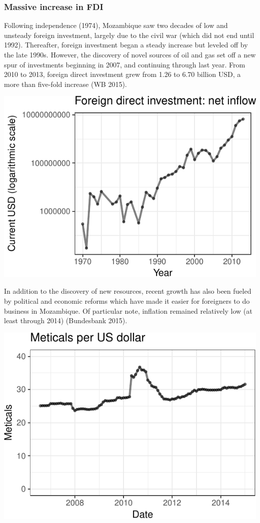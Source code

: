 \documentclass[]{elsarticle} %
\begin{document}
\subsubsection{Massive increase in FDI}\label{massive-increase-in-fdi}

Following independence (1974), Mozambique saw two decades of low and
unsteady foreign investment, largely due to the civil war (which did not
end until 1992). Thereafter, foreign investment began a steady increase
but leveled off by the late 1990s. However, the discovery of novel
sources of oil and gas set off a new spur of investments beginning in
2007, and continuing through last year. From 2010 to 2013, foreign
direct investment grew from 1.26 to 6.70 billion USD, a more than
five-fold increase (WB 2015).

\begin{center}\includegraphics{paper_files/figure-latex/unnamed-chunk-5-1} \end{center}

In addition to the discovery of new resources, recent growth has also
been fueled by political and economic reforms which have made it easier
for foreigners to do business in Mozambique. Of particular note,
inflation remained relatively low (at least through 2014) (Bundesbank
2015).

\begin{center}\includegraphics{paper_files/figure-latex/unnamed-chunk-6-1} \end{center}
\end{document}
